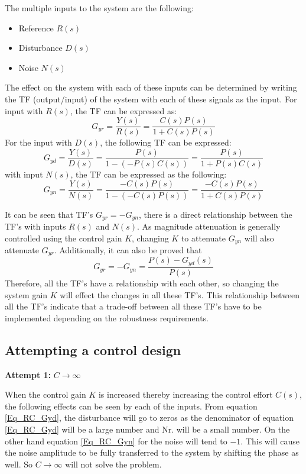 The multiple inputs to the system are the following:
\begin{itemize}
	\item Reference $R(s)$
	\item Disturbance $D(s)$
	\item Noise $N(s)$
\end{itemize}

The effect on the system with each of these inputs can be determined by writing the TF (output/input) of the system with each of these signals as the input. For input with $R(s)$, the TF can be expressed as:
\begin{equation} \label{Eq_RC_Gyr}
	G_{yr} = \frac{Y(s)}{R(s)} = \frac{C(s)P(s)}{1 + C(s)P(s)}
\end{equation}
For the input with $D(s)$, the following TF can be expressed:
\begin{equation} \label{Eq_RC_Gyd}
	G_{yd} = \frac{Y(s)}{D(s)} = \frac{P(s)}{1 - (-P(s)C(s))} = \frac{P(s)}{1 + P(s)C(s)}
\end{equation}
with input $N(s)$, the TF can be expressed as the following:
\begin{equation} \label{Eq_RC_Gyn}
	G_{yn} = \frac{Y(s)}{N(s)} = \frac{-C(s)P(s)}{1 - (-C(s)P(s))} = \frac{-C(s)P(s)}{1 + C(s)P(s)}
\end{equation}

It can be seen that TF's $G_{yr} = - G_{yn}$, there is a direct relationship between the TF's with inputs $R(s)$ and $N(s)$. As magnitude attenuation is generally controlled using the control gain $K$, changing $K$ to attenuate $G_{yn}$ will also attenuate $G_{yr}$. Additionally, it can also be proved that 
$$ G_{yr} = - G_{yn} = \frac{P(s) - G_{yd}(s)}{P(s)} $$ Therefore, all the TF's have a relationship with each other, so changing the system gain $K$ will effect the changes in all these TF's. This relationship between all the TF's indicate that a trade-off between all these TF's have to be implemented depending on the robustness requirements.

\subsection{Attempting a control design}

\textbf{Attempt 1: }$C \rightarrow \infty$

When the control gain $K$ is increased thereby increasing the control effort $C(s)$, the following effects can be seen by each of the inputs. From equation \eqref{Eq_RC_Gyd}, the disturbance will go to zeros as the denominator of equation \eqref{Eq_RC_Gyd} will be a large number and Nr. will be a small number. On the other hand equation \eqref{Eq_RC_Gyn} for the noise will tend to $-1$. This will cause the noise amplitude to be fully transferred to the system by shifting the phase as well. So $C \rightarrow \infty$ will not solve the problem.

